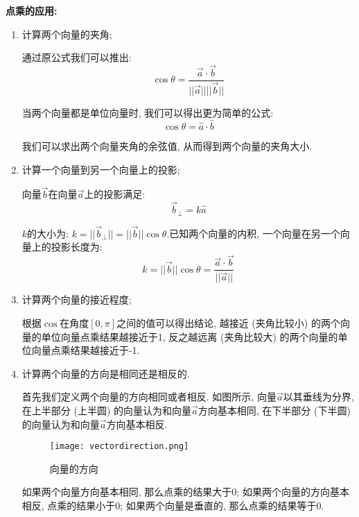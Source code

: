 \documentclass[openany]{progbookcn}
\begin{document}
\textbf{点乘的应用: }
\begin{enumerate}[1)]
	\item 计算两个向量的夹角; 
	
	通过原公式我们可以推出: 
	\begin{equation}
	\cos\theta=\frac{\overrightarrow{a}\cdot\overrightarrow{b}}{||\overrightarrow{a}||||\overrightarrow{b}||}
	\end{equation}

	当两个向量都是单位向量时, 我们可以得出更为简单的公式: 
	\begin{equation}
		\cos\theta=\hat{a}\cdot\hat{b}
	\end{equation}
	
	我们可以求出两个向量夹角的余弦值, 从而得到两个向量的夹角大小. 
	
	\item 计算一个向量到另一个向量上的投影; 
	
	向量$\overrightarrow{b}$在向量$\overrightarrow{a}$上的投影满足: 
	\begin{equation}
		\overrightarrow{b}_\perp=k\hat{a}
	\end{equation}

	$k$的大小为: $k = ||\overrightarrow{b}_\perp||=||\overrightarrow{b}||\cos\theta$.已知两个向量的内积, 一个向量在另一个向量上的投影长度为: 
	\begin{equation}
		k=||\overrightarrow{b}||\cos\theta=\frac{\overrightarrow{a}\cdot\overrightarrow{b}}{||\overrightarrow{a}||}
	\end{equation}

	\item 计算两个向量的接近程度; 
	
	根据$\cos$在角度$[0,\pi]$之间的值可以得出结论, 越接近 (夹角比较小) 的两个向量的单位向量点乘结果越接近于1, 反之越远离 (夹角比较大) 的两个向量的单位向量点乘结果越接近于-1.
	
	\item 计算两个向量的方向是相同还是相反的. 
	
	首先我们定义两个向量的方向相同或者相反. 如图所示, 向量$\overrightarrow{a}$以其垂线为分界, 在上半部分 (上半圆) 的向量认为和向量$\overrightarrow{a}$方向基本相同, 在下半部分 (下半圆) 的向量认为和向量$\overrightarrow{a}$方向基本相反. 
	\begin{figure}[H]
		\centering
		\texttt{[image: vectordirection.png]}
		\caption{向量的方向}
		\label{fig:vectordir}
	\end{figure}

	如果两个向量方向基本相同, 那么点乘的结果大于0; 如果两个向量的方向基本相反, 点乘的结果小于0; 如果两个向量是垂直的, 那么点乘的结果等于0.
	
	
\end{enumerate}
\end{document}
